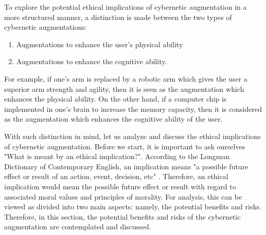 To explore the potential ethical implications of cybernetic augmentation in a more structured manner, a distinction is made between the two types of cybernetic augmentations: 
\begin{enumerate}
	\item Augmentations to enhance the user's physical ability
	\item Augmentations to enhance the cognitive ability.
\end{enumerate}
For example, if one's arm is replaced by a robotic arm which gives the user a superior arm strength and agility, then it is seen as the augmentation which enhances the physical ability. On the other hand, if a computer chip is implemented in one's brain to increase the memory capacity, then it is considered as the augmentation which enhances the cognitive ability of the user. 

With such distinction in mind, let us analyze and discuss the ethical implications of cybernetic augmentation. Before we start, it is important to ask ourselves "What is meant by an ethical implication?". According to the Longman Dictionary of Contemporary English, an implication means "a possible future effect or result of an action, event, decision, etc" \cite{Longman_dic}. Therefore, an ethical implication would mean the possible future effect or result with regard to associated moral values and principles of morality. For analysis, this can be viewed as divided into two main aspects: namely, the potential benefits and risks. Therefore, in this section, the potential benefits and risks of the cybernetic augmentation are contemplated and discussed.